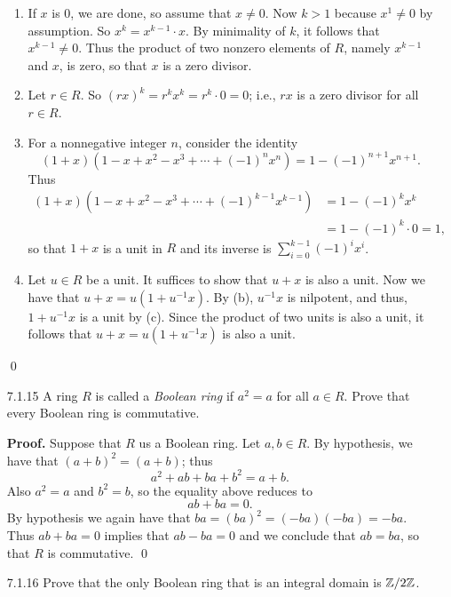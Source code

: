 \begin{enumerate}
      \begin{enumerate}
         \item If $x$ is 0, we are done, so assume that $x \neq 0$. Now $k > 1$ 
               because $x^1 \neq 0$ by assumption. So $x^k = x^{k-1} \cdot x$. 
               By minimality of $k$, it follows that $x^{k-1} \neq 0$. Thus the 
               product of two nonzero elements of $R$, namely $x^{k-1}$ and $x$, 
               is zero, so that $x$ is a zero divisor.
         \item Let $r \in R$. So $(rx)^k = r^kx^k = r^k \cdot 0 = 0$; i.e., $rx$
               is a zero divisor for all $r \in R$.
         \item For a nonnegative integer $n$, consider the identity
               $$(1+x)(1-x+x^2-x^3+\cdots+(-1)^nx^n) = 1 - (-1)^{n+1}x^{n+1}.$$
               Thus
               \begin{align*}
                  (1+x)(1-x+x^2-x^3+\cdots+(-1)^{k-1}x^{k-1}) &= 1 - (-1)^kx^k\\
                     &= 1 - (-1)^k \cdot 0 = 1,
               \end{align*}
               so that $1+x$ is a unit in $R$ and its inverse is
               $\sum_{i=0}^{k-1}(-1)^ix^i$.
         \item Let $u \in R$ be a unit. It suffices to show that $u + x$ is also
               a unit. Now we have that $u + x = u(1 + u^{-1}x)$. By (b),
               $u^{-1}x$ is nilpotent, and thus, $1 + u^{-1}x$ is a unit by
               (c). Since the product of two units is also a unit, it follows
               that $u + x = u(1 + u^{-1}x)$ is also a unit.
      \end{enumerate} \qed
   \item[7.1.15]  A ring $R$ is called a \textit{Boolean ring} if $a^2 = a$ for
                  all $a \in R$. Prove that every Boolean ring is commutative.

      \textbf{Proof.} Suppose that $R$ us a Boolean ring. Let $a, b \in R$. By
      hypothesis, we have that $(a + b)^2 = (a + b)$; thus
      $$a^2 + ab + ba + b^2 = a + b.$$
      Also $a^2 = a$ and $b^2 = b$, so the equality above reduces to
      $$ab + ba = 0.$$
      By hypothesis we again have that $ba = (ba)^2 = (-ba)(-ba) = -ba$. Thus
      $ab + ba = 0$ implies that $ab - ba = 0$ and we conclude that $ab = ba$,
      so that $R$ is commutative. \qed
   \item[7.1.16]  Prove that the only Boolean ring that is an integral domain is
                  $\mathbb{Z}/2\mathbb{Z}$.


\end{enumerate}
